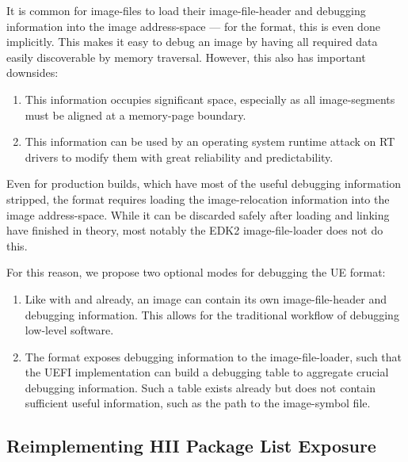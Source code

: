 It is common for \glspl{image-file} to load their \gls{image-file-header} and debugging information into the \gls{image} \gls{address-space} --- for the  format, this is even done implicitly. This makes it easy to debug an \gls{image} by having all required data easily discoverable by memory traversal. However, this also has important downsides:
\begin{enumerate}
  \item This information occupies significant space, especially as all \glspl{image-segment} must be aligned at a \gls{memory-page} boundary.
  \item This information can be used by an operating system runtime attack on \gls{RT} drivers to modify them with great reliability and predictability.
\end{enumerate}

Even for production builds, which have most of the useful debugging information stripped, the  format requires loading the \gls{image-relocation} information into the \gls{image} \gls{address-space}. While it can be discarded safely after loading and linking have finished in theory, most notably the \gls{EDK2}  \gls{image-file-loader} does not do this.

For this reason, we propose two optional modes for debugging the \gls{UE} format:
\begin{enumerate}
  \item Like with  and  already, an \gls{image} can contain its own \gls{image-file-header} and debugging information. This allows for the traditional workflow of debugging low-level software.
  \item The format exposes debugging information to the \gls{image-file-loader}, such that the \gls{UEFI} implementation can build a debugging table to aggregate crucial debugging information. Such a table exists already but does not contain sufficient useful information, such as the path to the \gls{image-symbol} file.
\end{enumerate}

\subsection{Reimplementing HII Package List Exposure}

